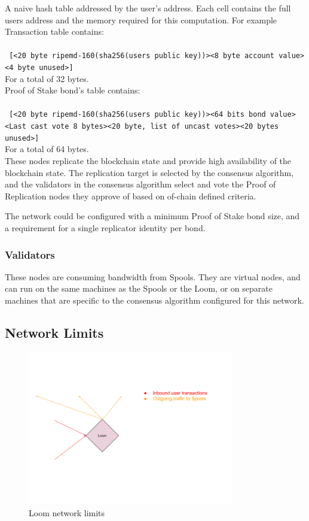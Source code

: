 \documentclass[12pt]{article}
\begin{document}
A naive hash table addressed by the user’s address. Each cell contains the full users address and the memory required for this computation. For example\\
\noindent Transaction table contains:\\\\\noindent
\texttt{
[<20 byte ripemd-160(sha256(users public key))><8 byte account value><4 byte unused>]\\
}
For a total of 32 bytes.\\
\noindent Proof of Stake bond’s table contains:\\\\\noindent
\texttt{
[<20 byte ripemd-160(sha256(users public key))><64 bits bond value><Last cast vote 8 bytes><20 byte, list of uncast votes><20 bytes unused>]\\
}
For a total of 64 bytes.\\
These nodes replicate the blockchain state and provide high availability of the blockchain state. The replication target is selected by the consensus algorithm, and the validators in the consensus algorithm select and vote the Proof of Replication nodes they approve of based on of-chain defined criteria.

The network could be configured with a minimum Proof of Stake bond size, and a requirement for a single replicator identity per bond.
\subsubsection{Validators}
These nodes are consuming bandwidth from Spools. They are virtual nodes, and can run on the same machines as the Spools or the Loom, or on separate machines that are specific to the consensus algorithm configured for this network.

\subsection{Network Limits}

\begin{figure}
  \begin{center}
    \centering
    \includegraphics[width=0.8\textwidth]{figures/fig_10.png}
    \caption[Fig 10]{Loom network limits\label{fig_10}}
  \end{center}
  \end{figure}
\end{document}
